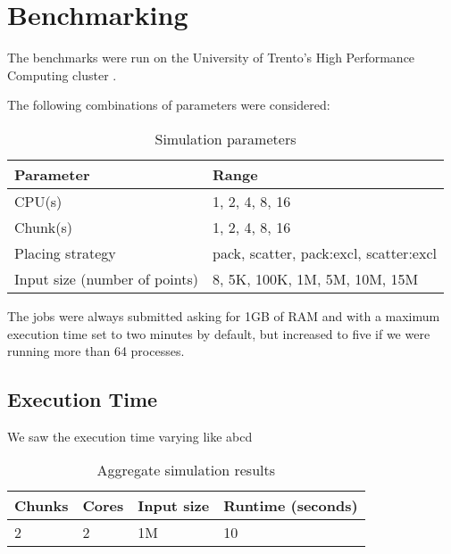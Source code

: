 \section{Benchmarking}
\label{sec:benchmarking}

The benchmarks were run on the University of Trento's High Performance Computing cluster
.

The following combinations of parameters were considered:

\begin{table}[ht]
  \centering
  \caption{Simulation parameters}
  \begin{tabular}{l|l}
    \hline
    Parameter                                        & Range                                    \\
    \hline
    CPU(s)                                           & {1, 2, 4, 8, 16}                         \\
    Chunk(s)                                         & {1, 2, 4, 8, 16}                         \\
    Placing strategy \cite[§4.7.1]{pbs_super_manual} & {pack, scatter, pack:excl, scatter:excl} \\
    Input size (number of points)                    & {8, 5K, 100K, 1M, 5M, 10M, 15M }         \\
    \hline
  \end{tabular}
\end{table}

The jobs were always submitted asking for 1GB of RAM and with a maximum execution time set to two minutes by default, but increased to five if we were running more than 64 processes.


\subsection{Execution Time}

We saw the execution time varying like abcd
\begin{table}[ht]
  \centering
  \caption{Aggregate simulation results}
  \begin{tabular}{l|l|l|l}
    \hline
    Chunks & Cores & Input size & Runtime (seconds) \\
    \hline
    2      & 2     & 1M         & 10                \\
    \hline
  \end{tabular}
\end{table}

